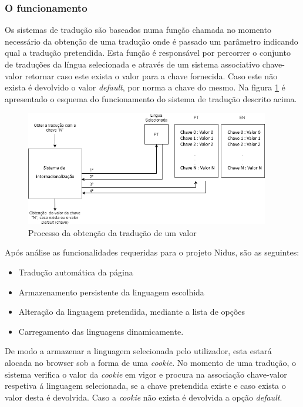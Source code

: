 \subsubsection{O funcionamento}
\par Os sistemas de tradução são baseados numa função chamada no momento necessário da obtenção de uma tradução onde é passado um parâmetro indicando qual a tradução pretendida. Esta função é responsável por percorrer o conjunto de traduções da língua selecionada e através de um sistema associativo chave-valor retornar caso este exista o valor para a chave fornecida. Caso este não exista é devolvido o valor \textit{default}, por norma a chave do mesmo. Na figura \ref{i18n} é apresentado o esquema do funcionamento do sistema de tradução descrito acima.

\begin{figure}[ht]
\centering
\includegraphics[width=0.95\textwidth]{images/i18n.png}
\caption{Processo da obtenção da tradução de um valor}\label{i18n}
\end{figure}

\par Após análise as funcionalidades requeridas para o projeto Nidus, são as seguintes:

\begin{itemize}
\item Tradução automática da página
\item Armazenamento persistente da linguagem escolhida
\item Alteração da linguagem pretendida, mediante a lista de opções
\item Carregamento das linguagens dinamicamente.
\end{itemize} 

\par De modo a armazenar a linguagem selecionada pelo utilizador, esta estará alocada no browser sob a forma de uma \textit{cookie}. No momento de uma tradução, o sistema verifica o valor da \textit{cookie} em vigor e procura na associação chave-valor respetiva á linguagem selecionada, se a chave pretendida existe e caso exista o valor desta é devolvida. Caso a \textit{cookie} não exista é devolvida a opção \textit{default}.

